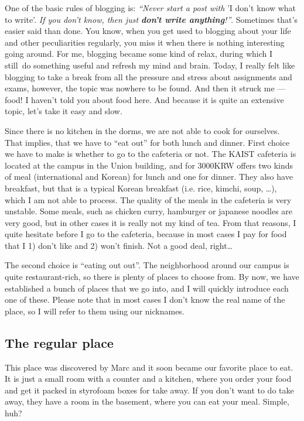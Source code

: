 \begin{post}
	\begin{content}
One of the basic rules of blogging is: \textit{``Never start a post with} 'I don't know what to write'. \textit{If you don't know, then just \textbf{don't write anything}!''}. Sometimes that's easier said than done. You know, when you get used to blogging about your life and other peculiarities regularly, you miss it when there is nothing interesting going around. For me, blogging became some kind of relax, during which I still do something useful and refresh my mind and brain. Today, I really felt like blogging to take a break from all the pressure and stress about assignments and exams, however, the topic was nowhere to be found. And then it struck me --- food! I haven't told you about food here. And because it is quite an extensive topic, let's take it easy and slow.

Since there is no kitchen in the dorms, we are not able to cook for ourselves. That implies, that we have to ``eat out'' for both lunch and dinner. First choice we have to make is whether to go to the cafeteria or not. The KAIST cafeteria is located at the campus in the Union building, and for 3000KRW offers two kinds of meal (international and Korean) for lunch and one for dinner. They also have breakfast, but that is a typical Korean breakfast (i.e. rice, kimchi, soup, {\ldots}), which I am not able to process. The quality of the meals in the cafeteria is very unstable. Some meals, such as chicken curry, hamburger or japanese noodles are very good, but in other cases it is really not my kind of tea. From that reasons, I quite hesitate before I go to the cafeteria, because in most cases I pay for food that I 1) don't like and 2) won't finish. Not a good deal, right\ldots

The second choice is ``eating out out''. The neighborhood around our campus is quite restaurant-rich, so there is plenty of places to choose from. By now, we have established a bunch of places that we go into, and I will quickly introduce each one of these. Please note that in most cases I don't know the real name of the place, so I will refer to them using our nicknames.

\subsection{The regular place}
This place was discovered by Marc and it soon became our favorite place to eat. It is just a small room with a counter and a kitchen, where you order your food and get it packed in styrofoam boxes for take away. If you don't want to do take away, they have a room in the basement, where you can eat your meal. Simple, huh?


\end{content}
\end{post}
